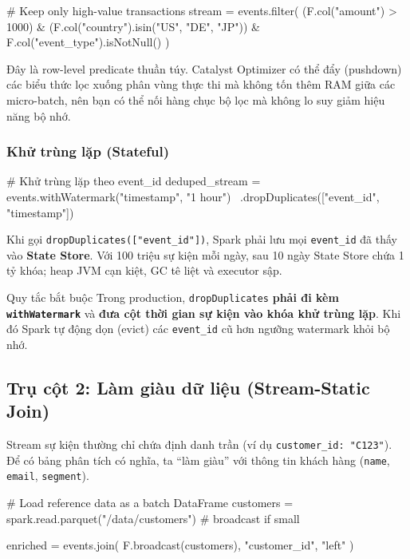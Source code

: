 \documentclass[12pt]{article}
\begin{document}
\begin{aivnpybox}
# Keep only high-value transactions
stream = events.filter(
    (F.col("amount") > 1000) &
    (F.col("country").isin("US", "DE", "JP")) &
    F.col("event_type").isNotNull()
)
\end{aivnpybox}

Đây là row-level predicate thuần túy. Catalyst Optimizer có thể đẩy (pushdown) các biểu thức lọc xuống phân vùng thực thi mà không tốn thêm RAM giữa các micro-batch, nên bạn có thể nối hàng chục bộ lọc mà không lo suy giảm hiệu năng bộ nhớ.

\subsubsection{Khử trùng lặp (Stateful)}

\begin{aivnpybox}
# Khử trùng lặp theo event_id
deduped_stream = events.withWatermark("timestamp", "1 hour") \
                       .dropDuplicates(["event_id", "timestamp"])
\end{aivnpybox}

Khi gọi \texttt{dropDuplicates(["event\_id"])}, Spark phải lưu mọi \texttt{event\_id} đã thấy vào \textbf{State Store}. Với 100 triệu sự kiện mỗi ngày, sau 10 ngày State Store chứa 1 tỷ khóa; heap JVM cạn kiệt, GC tê liệt và executor sập.

\begin{guidelinebox}{Quy tắc bắt buộc}
Trong production, \texttt{dropDuplicates} \textbf{phải đi kèm \texttt{withWatermark}} và \textbf{đưa cột thời gian sự kiện vào khóa khử trùng lặp}. Khi đó Spark tự động dọn (evict) các \texttt{event\_id} cũ hơn ngưỡng watermark khỏi bộ nhớ.
\end{guidelinebox}

\subsection{Trụ cột 2: Làm giàu dữ liệu (Stream-Static Join)}

Stream sự kiện thường chỉ chứa định danh trần (ví dụ \texttt{customer\_id: "C123"}). Để có bảng phân tích có nghĩa, ta ``làm giàu'' với thông tin khách hàng (\texttt{name}, \texttt{email}, \texttt{segment}).

\begin{aivnpybox}
# Load reference data as a batch DataFrame
customers = spark.read.parquet("/data/customers")  # broadcast if small

enriched = events.join(
    F.broadcast(customers),
    "customer_id",
    "left"
)
\end{aivnpybox}
\end{document}
